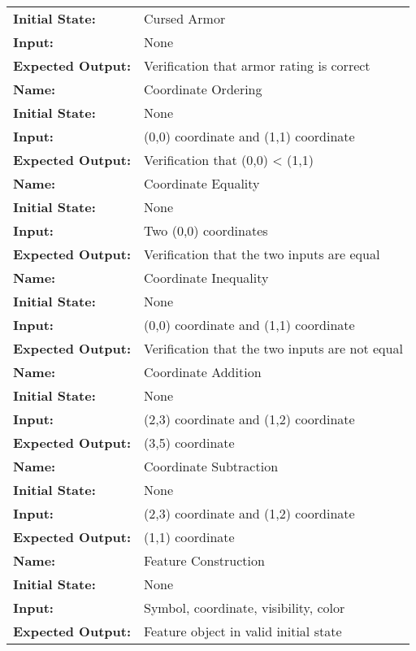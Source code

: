 \documentclass[12pt, titlepage]{article}
\begin{document}
\begin{center}
\begin{longtable}{ l | p{10cm} }
				\textbf{Initial State:} & Cursed Armor\\
				\textbf{Input:} & None\\
				\textbf{Expected Output:} & Verification that armor rating is correct\\[0.6em]
				\hline
				\rule{0pt}{1.5em}\textbf{Name:} & Coordinate Ordering\\
				\textbf{Initial State:} & None\\
				\textbf{Input:} & (0,0) coordinate and (1,1) coordinate\\
				\textbf{Expected Output:} & Verification that (0,0) < (1,1)\\[0.6em]
				\hline
				\rule{0pt}{1.5em}\textbf{Name:} & Coordinate Equality\\
				\textbf{Initial State:} & None\\
				\textbf{Input:} & Two (0,0) coordinates\\
				\textbf{Expected Output:} & Verification that the two inputs are equal\\[0.6em]
				\hline
				\rule{0pt}{1.5em}\textbf{Name:} & Coordinate Inequality\\
				\textbf{Initial State:} & None\\
				\textbf{Input:} & (0,0) coordinate and (1,1) coordinate\\
				\textbf{Expected Output:} & Verification that the two inputs are not equal\\[0.6em]
				\hline
				\rule{0pt}{1.5em}\textbf{Name:} & Coordinate Addition\\
				\textbf{Initial State:} & None\\
				\textbf{Input:} & (2,3) coordinate and (1,2) coordinate\\
				\textbf{Expected Output:} & (3,5) coordinate\\[0.6em]
				\hline
				\rule{0pt}{1.5em}\textbf{Name:} & Coordinate Subtraction\\
				\textbf{Initial State:} & None\\
				\textbf{Input:} & (2,3) coordinate and (1,2) coordinate\\
				\textbf{Expected Output:} & (1,1) coordinate\\[0.6em]
				\hline
				\rule{0pt}{1.5em}\textbf{Name:} & Feature Construction\\
				\textbf{Initial State:} & None\\
				\textbf{Input:} & Symbol, coordinate, visibility, color\\
				\textbf{Expected Output:} & Feature object in valid initial state\\[0.6em]

\end{longtable}
\end{center}
\end{document}
